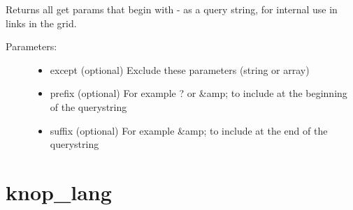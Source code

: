 \documentclass[letterpaper,10pt,english]{sphinxmanual}
\begin{document}
\begin{fulllineitems}
\begin{fulllineitems}
\end{fulllineitems}


\begin{fulllineitems}
\label{knop_grid:knop_grid.urlargs}
Returns all get params that begin with - as a query string, for internal use in links in the grid.
\begin{description}
\item[{Parameters:}] \leavevmode\begin{itemize}
\item {} 
except (optional)
Exclude these parameters (string or array)

\item {} 
prefix (optional)
For example ? or \&amp; to include at the beginning of the querystring

\item {} 
suffix (optional)
For example \&amp; to include at the end of the querystring

\end{itemize}

\end{description}

\end{fulllineitems}


\begin{fulllineitems}
\label{knop_grid:knop_grid.version}
\end{fulllineitems}



\begin{fulllineitems}
\end{fulllineitems}


\end{fulllineitems}



\chapter{knop\_lang}
\label{knop_lang::doc}\label{knop_lang:knop-lang}
\end{document}
